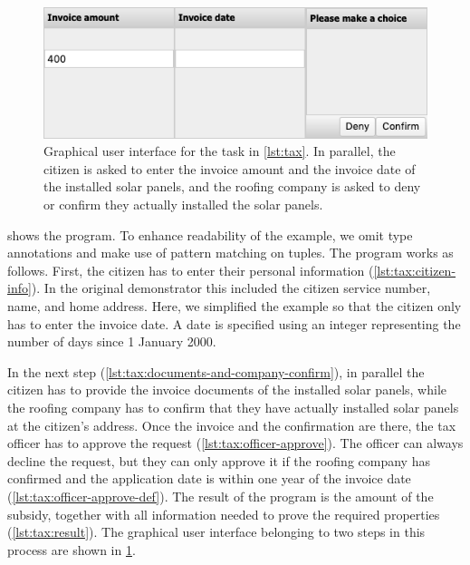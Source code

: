\begin{figure}[ht]
  \includegraphics[width=\columnwidth]{figures/tax-enter}
  \caption{
    Graphical user interface for the task in \cref{lst:tax}.
    In parallel, the citizen is asked to enter the invoice amount and the invoice date of the installed solar panels,
    and the roofing company is asked to deny or confirm they actually installed the solar panels.
  }
  \label{fig:tax}
\end{figure}

 shows the program.
To enhance readability of the example,
we omit type annotations and make use of pattern matching on tuples.
The program works as follows.
First, the citizen has to enter their personal information (\cref{lst:tax:citizen-info}).
In the original demonstrator this included the citizen service number, name, and home address.
Here, we simplified the example so that the citizen only has to enter the invoice date.
A date is specified using an integer representing the number of days since 1 January 2000.

In the next step (\cref{lst:tax:documents-and-company-confirm}), in parallel the citizen has to provide the invoice documents of the installed solar panels, while the roofing company has to confirm that they have actually installed solar panels at the citizen's address.
Once the invoice and the confirmation are there, the tax officer has to approve the request (\cref{lst:tax:officer-approve}).
The officer can always decline the request, but they can only approve it if the roofing company has confirmed and the application date is within one year of the invoice date (\cref{lst:tax:officer-approve-def}).
The result of the program is the amount of the subsidy, together with all information needed to prove the required properties (\cref{lst:tax:result}).
The graphical user interface belonging to two steps in this process are shown in \cref{fig:tax}.

